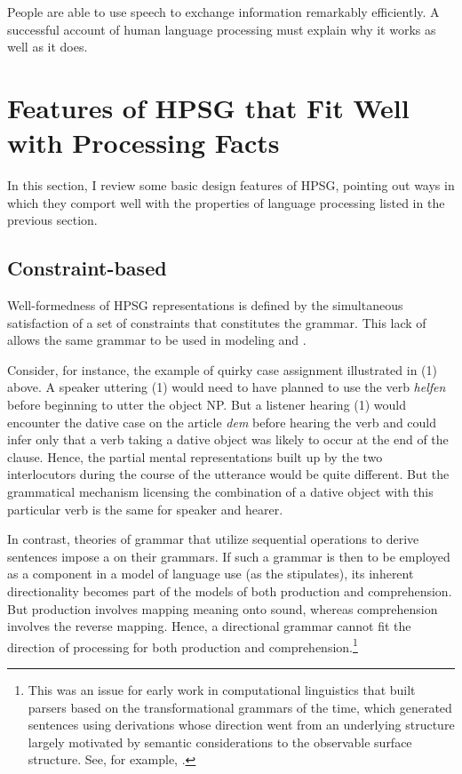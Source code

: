\documentclass[a4paper]{article}
\begin{document}
People are able to use speech to exchange information remarkably efficiently.  A successful account of human language processing must explain why it works as well as it does.  

\section{Features of HPSG that Fit Well with Processing Facts}

In this section, I review some basic design features of HPSG, pointing out ways in which they comport well with the properties of language processing listed in the previous section.

\subsection{Constraint-based}

Well-formedness of HPSG representations is defined by the simultaneous satisfaction of a set of constraints that constitutes the grammar.  This lack of  allows the same grammar to be used in modeling  and .

Consider, for instance, the example of quirky case assignment illustrated in (1) above.  A speaker uttering (1) would need to have planned to use the verb {\it helfen} before beginning to utter the object NP.  But a listener hearing (1) would encounter the dative case on the article {\it dem} before hearing the verb and could infer only that a verb taking a dative object was likely to occur at the end of the clause.  Hence, the partial mental representations built up by the two interlocutors during the course of the utterance would be quite different.  But the grammatical mechanism licensing the combination of a dative object with this particular verb is the same for speaker and hearer. 

In contrast, theories of grammar that utilize sequential operations to derive sentences impose a  on their grammars.  If such a grammar is then to be employed as a component in a model of language use (as the  stipulates), its inherent directionality becomes part of the models of both production and comprehension.  But production involves mapping meaning onto sound, whereas comprehension involves the reverse mapping.  Hence, a directional grammar cannot fit the direction of processing for both production and comprehension.\footnote{This was an issue for early work in computational linguistics that built parsers based on the transformational grammars of the time, which generated sentences using derivations whose direction went from an underlying structure largely motivated by semantic considerations to the observable surface structure.  See, for example, \citet{HobbsGrishman75}.}  
\end{document}

